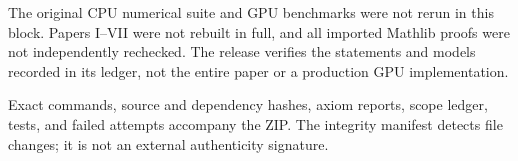 The original CPU numerical suite and GPU benchmarks were not rerun in this block. Papers I--VII were not rebuilt in full, and all imported Mathlib proofs were not independently rechecked. The release verifies the statements and models recorded in its ledger, not the entire paper or a production GPU implementation.

Exact commands, source and dependency hashes, axiom reports, scope ledger, tests, and failed attempts accompany the ZIP. The integrity manifest detects file changes; it is not an external authenticity signature.
